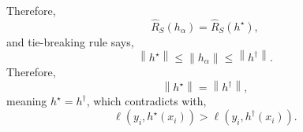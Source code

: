 \documentclass{article}
\begin{document}
Therefore,
\begin{equation} 
\hat{R}_{S}\left(h_{\alpha}\right) = \hat{R}_{S}\left(h^\star \right),
\end{equation}
and tie-breaking rule says,
\begin{equation} 
\left\|h^\star \right\| \leq  \left\|h_{\alpha}\right\| \leq  \left\|h^{\dagger}\right\|.
\end{equation}
Therefore,
\begin{equation} 
\left\|h^\star \right\| = \left\|h^{\dagger}\right\|,
\end{equation}
meaning $h^\star  = h^{\dagger}$, which contradicts with,
\begin{equation} 
\ell\left(y_{i}, h^\star \left(x_{i}\right)\right) > \ell\left(y_{i},  h^{\dagger}\left(x_{i}\right)\right).
\end{equation}
\end{document}
